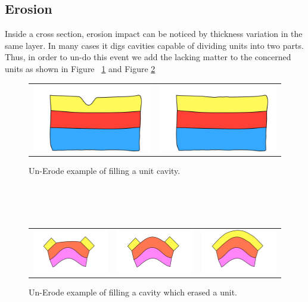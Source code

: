 \documentclass[12pt, a4paper]{report} %
\begin{document}
\subsection{Erosion}
Inside a cross section, erosion impact can be noticed by thickness variation in the same layer.
In many cases it digs cavities capable of dividing units into two parts. Thus, in order to un-do this event we add the lacking matter to the concerned units as shown in Figure ~\ref{unerodeeg} and Figure \ref{unerodecveg}

\begin{figure}[htb]
\centering
\begin{tabular}{@{}cc@{}}
\includegraphics[width=.35\textwidth]{unErodeUpDescription0.png}&
\includegraphics[width=.35\textwidth]{unErodeUpDescription1.png}\\
\end{tabular}
\caption{Un-Erode example of filling a unit cavity.}
\label{unerodeeg}
\end{figure}
\\\\\
\begin{figure}[htb]
\centering
\begin{tabular}{@{}ccc@{}}
\includegraphics[width=.35\textwidth]{unErodeConvexDescription0.png}&
\includegraphics[width=.35\textwidth]{unErodeConvexDescription1.png}&
\includegraphics[width=.35\textwidth]{unErodeConvexDescription2.png}\\
\end{tabular}
\caption{Un-Erode example of filling a cavity which erased a unit.}
\label{unerodecveg}
\end{figure}\\\\
\end{document}
